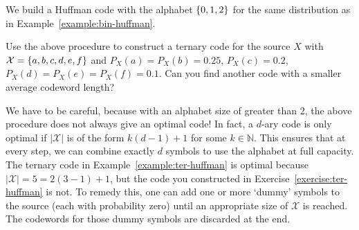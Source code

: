 \begin{example}\label{example:ter-huffman}
We build a Huffman code with the alphabet $\{0,1,2\}$ for the same distribution as in Example~\ref{example:bin-huffman}.
\begin{center}
\end{center}
\end{example}

\begin{exercise}\label{exercise:ter-huffman}
Use the above procedure to construct a ternary code for the source $X$ with $\mathcal{X} = \{a,b,c,d,e,f\}$ and $P_X(a) = P_X(b) = 0.25$, $P_X(c) = 0.2$, $P_X(d) = P_X(e) = P_X(f) = 0.1$. Can you find another code with a smaller average codeword length?
\end{exercise}
We have to be careful, because with an alphabet size of greater than 2, the above procedure does not always give an optimal code! In fact, a $d$-ary code is only optimal if $|\mathcal{X}|$ is of the form $k(d-1)+1$ for some $k \in \mathbb{N}$. This ensures that at every step, we can combine exactly $d$ symbols to use the alphabet at full capacity. The ternary code in Example~\ref{example:ter-huffman} is optimal because $|\mathcal{X}| = 5 = 2(3-1) + 1$, but the code you constructed in Exercise~\ref{exercise:ter-huffman} is not. To remedy this, one can add one or more `dummy' symbols to the source (each with probability zero) until an appropriate size of $\mathcal{X}$ is reached. The codewords for those dummy symbols are discarded at the end.

